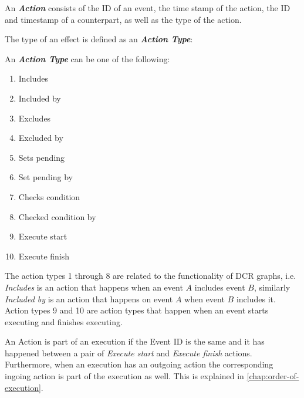 	\begin{definition}
		An \textit{\textbf{Action}} consists of the ID of an event, the time stamp of the action, the ID and timestamp of a counterpart, as well as  the type of the action.
	\end{definition}
	
	\newpar	The type of an effect is defined as an \textit{\textbf{Action Type}}:
	
	\begin{definition}
        \label{def:actiontype}
		An \textit{\textbf{Action Type}} can be one of the following:
		\begin{multicols}{3}
			\begin{enumerate}
				\item Includes\label{actiontype:includes}
				\item Included by\label{actiontype:includedby}
				\item Excludes\label{actiontype:excludes}
				\item Excluded by\label{actiontype:excludedby}
				\item Sets pending\label{actiontype:setspending}
				\item Set pending by\label{actiontype:setpendingby}
				\item Checks condition\label{actiontype:checkscondition}
				\item Checked condition by\label{actiontype:checkedconditionby}
				\item Execute start
				\item Execute finish
			\end{enumerate}
		\end{multicols}
	\end{definition}
	
	\newpar The action types 1 through 8 are related to the functionality of DCR graphs, i.e. \textit{Includes} is an action that happens when an event $A$ includes event $B$, similarly \textit{Included by} is an action that happens on event $A$ when event $B$ includes it. Action types 9 and 10 are action types that happen when an event starts executing and finishes executing. 
    
    \newpar
    An Action is part of an execution if the Event ID is the same and it has happened between a pair of \textit{Execute start} and \textit{Execute finish} actions. Furthermore, when an execution has an outgoing action the corresponding ingoing action is part of the execution as well. This is explained in \autoref{chap:order-of-execution}.
	
